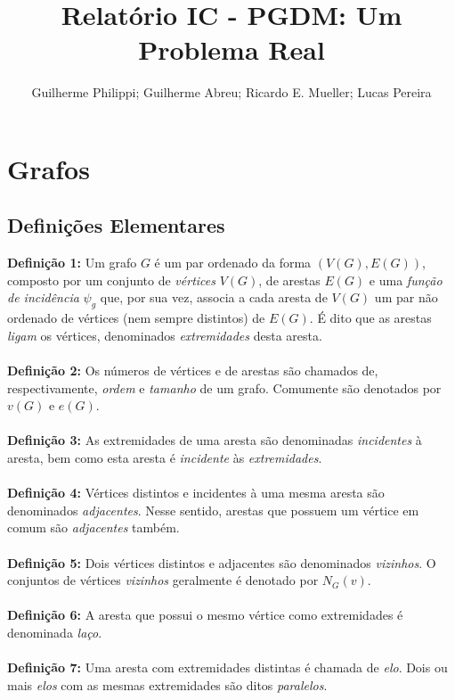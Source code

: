 \documentclass[a4paper,12pt]{article}
\title{Relatório IC - PGDM: Um Problema Real}
\author{Guilherme Philippi; Guilherme Abreu; Ricardo E. Mueller; Lucas Pereira}
\begin{document}
	\maketitle
	\tableofcontents
	\newpage
	
	\section{Grafos}
	\subsection{Definições Elementares}
	\noindent\textbf{Definição 1: } Um grafo $G$ é um par ordenado da forma $(V(G),E(G))$, composto por um conjunto de \textit{vértices} $V(G)$, de arestas $E(G)$ e uma \textit{função de incidência} $\psi_{g}$ que, por sua vez, associa a cada aresta de $V(G)$ um par não ordenado de vértices (nem sempre distintos) de $E(G)$. É dito que as arestas \textit{ligam} os vértices, denominados \textit{extremidades} desta aresta.
	\\
	\\
	\textbf{Definição 2: } Os números de vértices e de arestas são chamados de, respectivamente, \textit{ordem} e \textit{tamanho} de um grafo. Comumente são denotados por $v(G)$ e $e(G)$.
	\\
	\\
	\textbf{Definição 3: } As extremidades de uma aresta são denominadas \textit{incidentes} à aresta, bem como esta aresta é \textit{incidente} às \textit{extremidades}.
	\\
	\\
	\textbf{Definição 4: } Vértices distintos e incidentes à uma mesma aresta são denominados \textit{adjacentes}. Nesse sentido, arestas que possuem um vértice em comum são \textit{adjacentes} também.
	\\
	\\
	\textbf{Definição 5: } Dois vértices distintos e adjacentes são denominados \textit{vizinhos}. O conjuntos de vértices \textit{vizinhos} geralmente é denotado por $N_{G}(v)$.
	\\
	\\
	\textbf{Definição 6: } A aresta que possui o mesmo vértice como extremidades é denominada \textit{laço}.
	\\
	\\
	\textbf{Definição 7: } Uma aresta com extremidades distintas é chamada de \textit{elo}. Dois ou mais \textit{elos} com as mesmas extremidades são ditos \textit{paralelos}.
\end{document}
